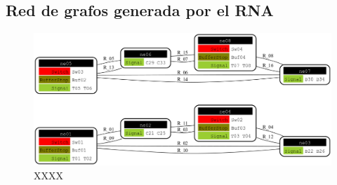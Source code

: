 \subsection{Red de grafos generada por el RNA}

 \lipsum[1]

\begin{figure}[H]
	\centering
	\includegraphics[width=1\textwidth]{Figuras/Graph_5}
	\centering\caption{XXXX}
\end{figure}

\lipsum[1]